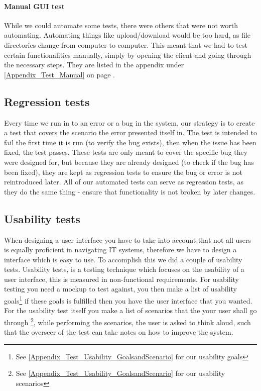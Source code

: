 \paragraph{Manual GUI test}
While we could automate some tests, there were others that were not worth automating. Automating things like upload/download would be too hard, as file directories change from computer to computer. This meant that we had to test certain functionalities manually, simply by opening the client and going through the necessary steps. They are listed in the appendix under \ref{Appendix_Test_Manual} on page \pageref{Appendix_Test_Manual}.

\subsection{Regression tests}
\label{Testing_Strategy_Regression}
Every time we run in to an error or a bug in the system, our strategy is to create a test that covers the scenario the error presented itself in. The test is intended to fail the first time it is run (to verify the bug exists), then when the issue has been fixed, the test passes. 
These tests are only meant to cover the specific bug they were designed for, but because they are already designed (to check if the bug has been fixed), they are kept as regression tests to ensure the bug or error is not reintroduced later. All of our automated tests can serve as regression tests, as they do the same thing - ensure that functionality is not broken by later changes.

\subsection{Usability tests}
\label{Testing_Strategy_Usability}
When designing a user interface you have to take into account that not all users is equally proficient in navigating IT systems, therefore we have to design a interface which is easy to use. To accomplish this we did a couple of usability tests. Usability tests, is a testing technique which focuses on the usability of a user interface, this is measured in non-functional requirements. For usability testing you need a mockup to test against, you then make a list of usability goals\footnote{See \ref{Appendix_Test_Usability_GoalsandScenario} for our usability goals} if these goals is fulfilled then you have the user interface that you wanted. For the usability test itself you make a list of scenarios that the your user shall go through \footnote{See \ref{Appendix_Test_Usability_GoalsandScenario} for our usability scenarios}, while performing the scenarios, the user is asked to think aloud, such that the overseer of the test can take notes on how to improve the system.

